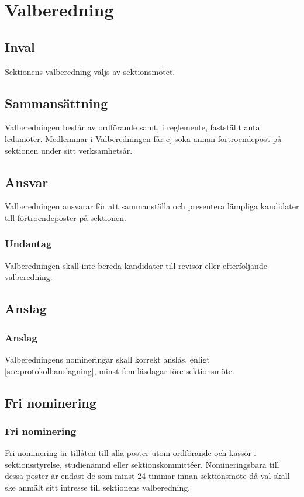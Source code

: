 \section{Valberedning}

\subsection{Inval}
Sektionens valberedning väljs av sektionsmötet.

\subsection{Sammansättning}
Valberedningen består av ordförande samt, i reglemente, fastställt antal ledamöter. Medlemmar i Valberedningen får ej söka annan förtroendepost på sektionen under sitt verksamhetsår.

\subsection{Ansvar}
Valberedningen ansvarar för att sammanställa och presentera lämpliga kandidater till förtroendeposter på sektionen.

\subsubsection{Undantag}
Valberedningen skall inte bereda kandidater till revisor eller efterföljande valberedning.

\subsection{Anslag}

\subsubsection{Anslag}
Valberedningens nomineringar skall korrekt anslås, enligt \ref{sec:protokoll:anslagning}, minst fem läsdagar före sektionsmöte.

\subsection{Fri nominering}

\subsubsection{Fri nominering}
Fri nominering är tillåten till alla poster utom ordförande och kassör i sektionsstyrelse, studienämnd eller sektionskommittéer. Nomineringsbara till dessa poster är endast de som minst 24 timmar innan sektionsmöte då val skall ske anmält sitt intresse till sektionens valberedning.
